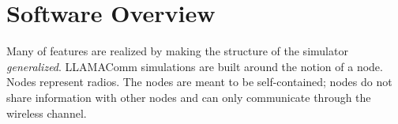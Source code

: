 

\section{Software Overview}

Many of features are realized by making the structure of the
simulator \emph{generalized}.  LLAMAComm simulations are built
around the notion of a node.  Nodes represent radios.  The nodes are
meant to be self-contained; nodes do not share information with
other nodes and can only communicate through the wireless channel.

